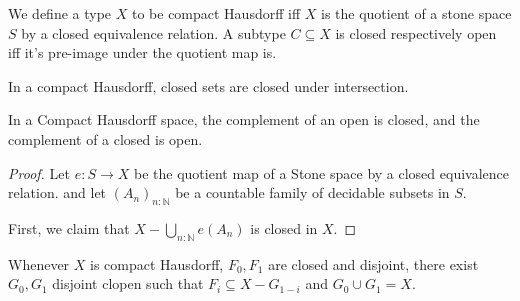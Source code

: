 \begin{definition}
We define a type $X$ to be compact Hausdorff iff 
$X$ is the quotient of a stone space $S$ by a closed equivalence relation. 
%
A subtype $C\subseteq X$ is closed respectively open iff it's pre-image under the quotient map is. 
\end{definition}

\begin{lemma}
  In a compact Hausdorff, closed sets are closed under intersection. 
\end{lemma}









\begin{lemma}
  In a Compact Hausdorff space, the complement of an open is closed, and the complement of a closed is open. 
\end{lemma}
\begin{proof}
  Let $e : S \to X$ be the quotient map of a Stone space by a closed equivalence relation. 
  and let $(A_n)_{n:\mathbb N}$ be a countable family of decidable subsets in $S$. 

  First, we claim that 
  $X - \bigcup_{n:\mathbb N} e(A_n)$
  is closed in $X$. 
\end{proof}

\begin{lemma}
  Whenever $X$ is compact Hausdorff, $F_0, F_1$ are closed and disjoint, 
  there exist $G_0, G_1$ disjoint clopen such that 
  $F_i \subseteq X - G_{1-i}$ and $G_0 \cup G_1 = X$. 
  
\end{lemma}

